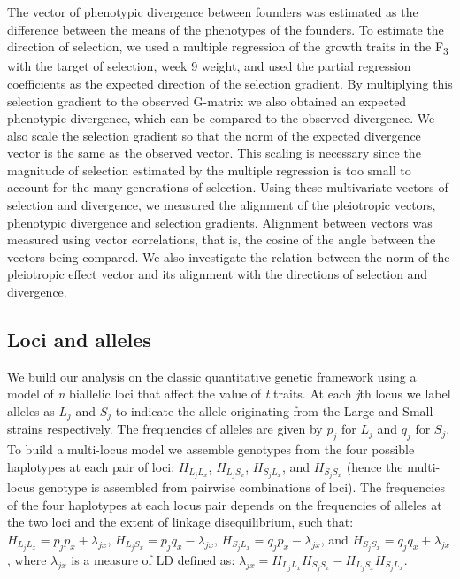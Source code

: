 \begin{refsection}
The vector of phenotypic divergence between founders was estimated as
the difference between the means of the phenotypes of the founders. To
estimate the direction of selection, we used a multiple regression of
the growth traits in the F\textsubscript{3} with the target of
selection, week 9 weight, and used the partial regression coefficients
as the expected direction of the selection gradient. By multiplying this
selection gradient to the observed G-matrix we also obtained an expected
phenotypic divergence, which can be compared to the observed divergence.
We also scale the selection gradient so that the norm of the expected
divergence vector is the same as the observed vector. This scaling is
necessary since the magnitude of selection estimated by the multiple
regression is too small to account for the many generations of
selection. Using these multivariate vectors of selection and divergence,
we measured the alignment of the pleiotropic vectors, phenotypic
divergence and selection gradients. Alignment between vectors was measured
using vector correlations, that is, the cosine of the angle between the
vectors being compared. We also investigate the relation between the
norm of the pleiotropic effect vector and its alignment with the
directions of selection and divergence.

\subsection{Loci and alleles}

We build our analysis on the classic quantitative genetic framework
using a model of \emph{n} biallelic loci that affect the value of
\emph{t} traits. At each \emph{j}th locus we label alleles
as \(L_{j}\) and \(S_{j}\) to indicate the allele originating from the Large
and Small strains respectively. The frequencies of alleles are given
by \(p_{j}\) for \(L_{j}\) and \(q_{j}\) for \(S_{j}\). To build a multi-locus
model we assemble genotypes from the four possible haplotypes at each
pair of loci: \(H_{L_{j}L_{x}}\), \(H_{L_{j}S_{x}}\), \(H_{S_{j}L_{x}}\), and \(H_{S_{j}S_{x}}\) (hence
the multi-locus genotype is assembled from pairwise combinations of
loci). The frequencies of the four haplotypes at each locus pair depends
on the frequencies of alleles at the two loci and the extent of linkage
disequilibrium, such
that: \(H_{L_{j}L_{x}} = p_{j}p_{x} + \lambda_{jx}\), \(H_{L_{j}S_{x}} = p_{j}q_{x} - \lambda_{jx}\), \(H_{S_{j}L_{x}} = q_{j}p_{x} - \lambda_{jx}\), and \(H_{S_{j}S_{x}} = q_{j}q_{x} + \lambda_{jx}\), where \(\lambda_{jx}\) is a measure of LD defined as: \(\lambda_{jx} = H_{L_{j}L_{x}}H_{S_{j}S_{x}} - H_{L_{j}S_{x}}H_{S_{j}L_{x}}\).


\end{refsection}
